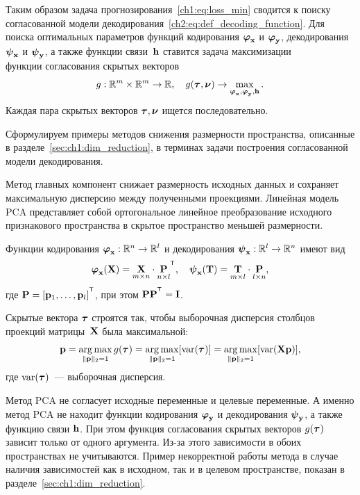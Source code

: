 Таким образом задача прогнозирования~\eqref{ch1:eq:loss_min} сводится к поиску согласованной модели декодирования~\eqref{ch2:eq:def_decoding_function}. 
Для поиска оптимальных параметров функций кодирования $\boldsymbol{\varphi}_{\mathbf{x}}$ и $\boldsymbol{\varphi}_{\mathbf{y}}$, декодирования $\boldsymbol{\psi}_{\mathbf{x}}$ и $\boldsymbol{\psi}_{\mathbf{y}}$, а также функции связи~$\mathbf{h}$ ставится задача максимизации $\textit{функции согласования скрытых векторов}$
\[
	g: \mathbb{R}^m \times \mathbb{R}^m \rightarrow \mathbb{R}, \quad g(\boldsymbol{\tau}, \boldsymbol{\nu}) \rightarrow \max_{\boldsymbol{\varphi}_{\mathbf{x}}, \boldsymbol{\varphi}_{\mathbf{y}}, \mathbf{h}}.
\]
Каждая пара скрытых векторов $\boldsymbol{\tau}, \boldsymbol{\nu}$ ищется последовательно.

Сформулируем примеры методов снижения размерности пространства, описанные в разделе~\ref{sec:ch1:dim_reduction}, в терминах задачи построения согласованной модели декодирования.

Метод главных компонент снижает размерность исходных данных и сохраняет максимальную дисперсию между полученными проекциями. 
Линейная модель PCA представляет собой ортогональное линейное преобразование исходного признакового пространства в скрытое пространство меньшей размерности. 

Функции кодирования $\boldsymbol{\varphi}_{\mathbf{x}}: \mathbb{R}^n \to \mathbb{R}^l$ и декодирования $\boldsymbol{\psi}_{\mathbf{x}}: \mathbb{R}^l \to \mathbb{R}^n$ имеют вид
\begin{equation*}
	\bphi_{\bx}(\bX) =  \underset{m \times n}\bX \cdot \underset{n \times l}\bP^{\T}, \quad	\bpsi_{\bx}(\bT) =  \underset{m \times l}\bT \cdot \underset{l \times n}\bP,
	\label{ch2:eq:PCA2}
\end{equation*}
где $\bP = [\bp_1, \dots, \bp_l]^{\T}$, при этом $\bP \bP^{\T} = \bI$.

Скрытые вектора $\boldsymbol{\tau}$ строятся так, чтобы выборочная дисперсия столбцов проекций матрицы~$\mathbf{X}$ была максимальной:
\begin{equation*}
	\mathbf{p} = \mathop{\arg \max}\limits_{\|\mathbf{p}\|_{2} = 1} g(\boldsymbol{\tau}) = \mathop{\arg \max}\limits_{\|\mathbf{p}\|_{2} = 1} [\text{var}(\boldsymbol{\tau})] = \mathop{\arg \max}\limits_{\|\mathbf{p}\|_{2} = 1} [\text{var}(\mathbf{X} \textbf{p})],
\end{equation*}
где $\text{var}(\boldsymbol{\tau})$~--- выборочная дисперсия.

Метод PCA не согласует исходные переменные и целевые переменные. 
А именно метод PCA не находит функции кодирования $\boldsymbol{\varphi}_{\mathbf{y}}$ и декодирования $\boldsymbol{\psi}_{\mathbf{y}}$, а также функцию связи $\mathbf{h}$. 
При этом функция согласования скрытых векторов $g(\boldsymbol{\tau})$ зависит только от одного аргумента.
Из-за этого зависимости в обоих пространствах не учитываются.
Пример некорректной работы  метода в случае наличия зависимостей как в исходном, так и в целевом пространстве, показан в разделе~\ref{sec:ch1:dim_reduction}.


